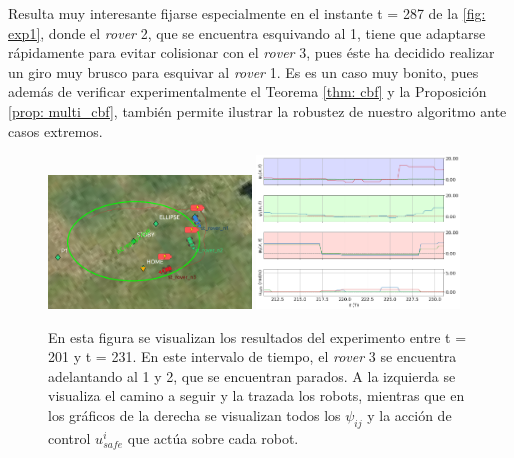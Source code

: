 Resulta muy interesante fijarse especialmente en el instante t = 287 de la \autoref{fig: exp1}, donde el \textit{rover} 2, que se encuentra esquivando al 1, tiene que adaptarse rápidamente para evitar colisionar con el \textit{rover} 3, pues éste ha decidido realizar un giro muy brusco para esquivar al \textit{rover} 1. Es es un caso muy bonito, pues además de verificar experimentalmente el Teorema \ref{thm: cbf} y la Proposición \ref{prop: multi_cbf}, también permite ilustrar la robustez de nuestro algoritmo ante casos extremos.

\vspace{1cm}

\begin{figure}[h!]
    \centering
    \includegraphics[trim={0 0cm 3.8cm 0cm}, clip, width=0.48\textwidth]{fig/231.png}
    \includegraphics[trim={0 0cm 0 0cm}, clip, width=0.48\textwidth]{fig/data_231.png}
    \caption{En esta figura se visualizan los resultados del experimento entre t = 201 y t = 231. En este intervalo de tiempo, el \textit{rover} 3 se encuentra adelantando al 1 y 2, que se encuentran parados. A la izquierda se visualiza el camino a seguir y la trazada los robots, mientras que en los gráficos de la derecha se visualizan todos los $\psi_{ij}$ y la acción de control $u_{safe}^i$ que actúa sobre cada robot.}
    \label{fig: exp1}
\end{figure}

